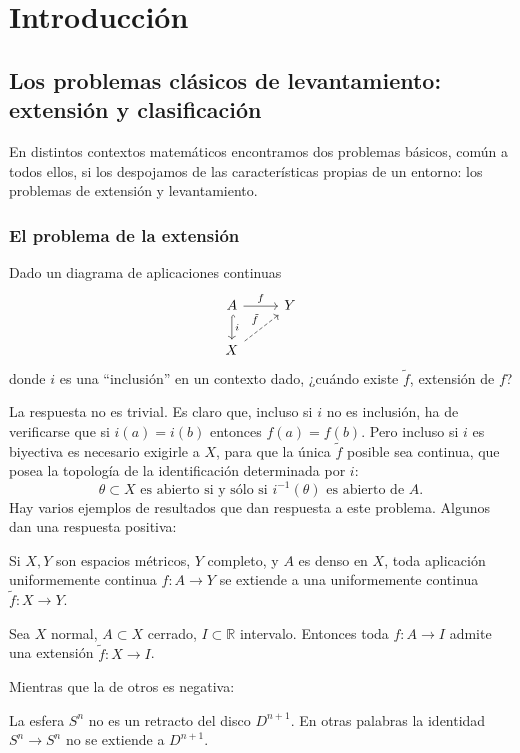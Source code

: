 \chapter{Introducción} 
\section{Los problemas clásicos de levantamiento: extensión y clasificación}
En distintos contextos matemáticos encontramos dos problemas básicos, común a todos ellos, si los despojamos de las características propias de un entorno: los problemas de extensión y levantamiento. \par

\subsection*{El problema de la extensión} 
Dado un diagrama de aplicaciones continuas 
$$
\begin{tikzcd}
	A \rar{f} \dar[hook]{i} & Y \\
	X \urar[dashed]{\tilde{f}}	&
\end{tikzcd} 
$$
donde $i$ es una ``inclusión'' en un contexto dado, ¿cuándo existe $\tilde{f}$, extensión de $f$? \par

La respuesta no es trivial. Es claro que, incluso si $i$ no es inclusión, ha de verificarse que si $i(a)= i(b)$ entonces $f(a) = f(b)$. Pero incluso si $i$ es biyectiva es necesario exigirle a $X$, para que la única $\tilde{f}$ posible sea continua, que posea la topología de la identificación determinada por $i$: 
$$
\theta \subset X \text{ es abierto si y sólo si } i^{-1} (\theta) \text{ es abierto de } A. 
$$
\newpage
Hay varios ejemplos de resultados que dan respuesta a este problema. Algunos dan una respuesta positiva:
\begin{teor} 
Si $X,Y$ son espacios métricos, $Y$ completo, y $A$ es denso en $X$, toda aplicación uniformemente continua $f:A\rightarrow Y $ se extiende a una uniformemente continua $\tilde{f} : X \rightarrow Y$.
\end{teor} 

\begin{teor}
Sea $X$ normal, $A \subset X$ cerrado, $I \subset \mathbb{R}$ intervalo. Entonces toda $f : A \rightarrow I $  admite una extensión $\tilde{f} : X \rightarrow I$.
\end{teor}
Mientras que la de otros es negativa:
\begin{teor} 
La esfera $S^{n}$ no es un retracto del disco $D^{n+1}$. En otras palabras la identidad $S^{n} \rightarrow S^{n}$ no se extiende a $D^{n+1}$.
\end{teor}

